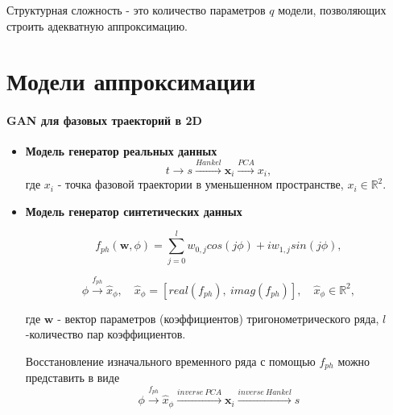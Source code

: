 \documentclass[12pt,twoside]{article}
\begin{document}
\begin{Def}
Структурная сложность - это количество параметров $q$ модели, позволяющих строить адекватную аппроксимацию.
\end{Def}



\section{Модели аппроксимации}
\paragraph{GAN для фазовых траекторий в 2D}

\begin{itemize}
\item \textbf{Модель генератор реальных данных}
\begin{equation}
	t \xrightarrow{} s\xrightarrow{Hankel}  \mathbf{x}_i \xrightarrow{PCA} x_i,
	\label{eq:GAN_real}
\end{equation}
где $x_i$ - точка фазовой траектории в уменьшенном пространстве, $x_i \in \mathbb{R}^2$.
\end{itemize}

\begin{itemize}
\item \textbf{Модель генератор синтетических данных}

\begin{equation}
	f_{ph}(\mathbf{w},\phi) = \sum_{j=0}^{l} w_{0,j}cos(j\phi) + i w_{1,j}sin(j\phi),
\label{eq:f_ph}
\end{equation}

\begin{equation}
	\phi \xrightarrow{f_{ph}} \hat{x}_{\phi},
	\quad
	\hat{x}_{\phi} = [real(f_{ph}),\:imag(f_{ph})],
	\quad
	\hat{x}_{\phi}  \in \mathbb{R}^2,
\label{eq:GAN_fake_1}
\end{equation}
\vspace{\baselineskip}

где $\mathbf{w}$ - вектор параметров (коэффициентов) тригонометрического ряда, $l$-количество пар коэффициентов.

Восстановление изначального временного ряда с помощью $f_{ph}$ можно представить в виде
\begin{equation}
	\phi \xrightarrow{f_{ph}} \hat{x}_{\phi} \xrightarrow{inverse~PCA}  \mathbf{x}_i \xrightarrow{inverse~Hankel}s
\label{eq:GAN_fake_2}
\end{equation}
\end{itemize}
\end{document}
